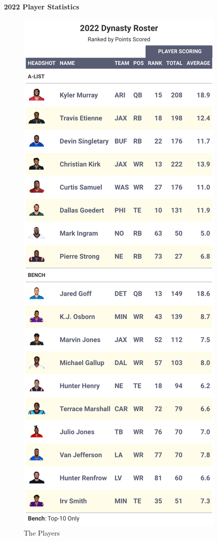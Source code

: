 \documentclass[
]{article}
\begin{document}
\textbf{2022 Player Statistics}

\begin{figure}
\includegraphics[width=0.75\linewidth,height=0.75\textheight]{output/2022/dynasty_roster_Cpmadden1} \caption{The Players}\label{fig:unnamed-chunk-27}
\end{figure}
\newpage
\end{document}
